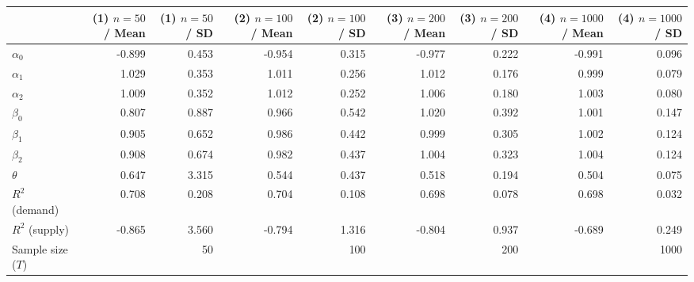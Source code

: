 
\begin{tabular}[t]{lrrrrrrrr}
\toprule
  & (1) $n=50$ / Mean & (1) $n=50$ / SD & (2) $n=100$ / Mean & (2) $n=100$ / SD & (3) $n=200$ / Mean & (3) $n=200$ / SD & (4) $n=1000$ / Mean & (4) $n=1000$ / SD\\
\midrule
$\alpha_{0}$ & -0.899 & 0.453 & -0.954 & 0.315 & -0.977 & 0.222 & -0.991 & 0.096\\
$\alpha_{1}$ & 1.029 & 0.353 & 1.011 & 0.256 & 1.012 & 0.176 & 0.999 & 0.079\\
$\alpha_{2}$ & 1.009 & 0.352 & 1.012 & 0.252 & 1.006 & 0.180 & 1.003 & 0.080\\
$\beta_{0}$ & 0.807 & 0.887 & 0.966 & 0.542 & 1.020 & 0.392 & 1.001 & 0.147\\
$\beta_{1}$ & 0.905 & 0.652 & 0.986 & 0.442 & 0.999 & 0.305 & 1.002 & 0.124\\
$\beta_{2}$ & 0.908 & 0.674 & 0.982 & 0.437 & 1.004 & 0.323 & 1.004 & 0.124\\
$\theta$ & 0.647 & 3.315 & 0.544 & 0.437 & 0.518 & 0.194 & 0.504 & 0.075\\
$R^{2}$ (demand) & 0.708 & 0.208 & 0.704 & 0.108 & 0.698 & 0.078 & 0.698 & 0.032\\
$R^{2}$ (supply) & -0.865 & 3.560 & -0.794 & 1.316 & -0.804 & 0.937 & -0.689 & 0.249\\
Sample size ($T$) &  & 50 &  & 100 &  & 200 &  & 1000\\
\bottomrule
\end{tabular}
